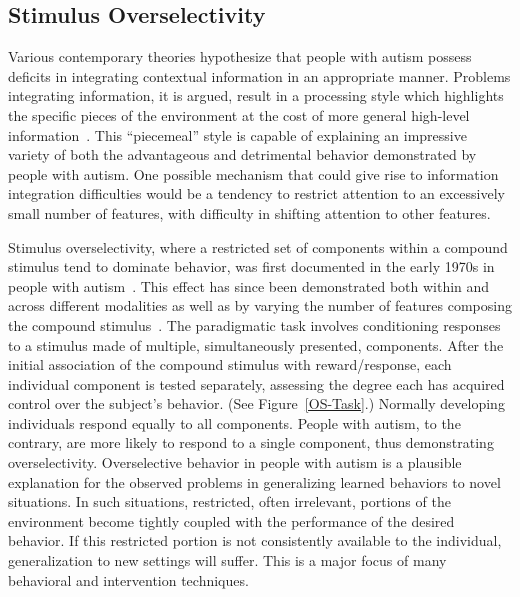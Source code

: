 %
%


\subsection{Stimulus Overselectivity}
Various contemporary theories hypothesize that people with autism possess deficits in integrating contextual information in an appropriate manner.  Problems integrating information, it is argued, result in a processing style which highlights the specific pieces of the environment at the cost of more general high-level information~\cite{HappeF:1999:WCC}. This ``piecemeal'' style is capable of explaining an impressive variety of both the advantageous and detrimental behavior demonstrated by people with autism.  One possible mechanism that could give rise to information integration difficulties would be a tendency to restrict attention to an excessively small number of features, with difficulty in shifting attention to other features.  

Stimulus overselectivity, where a restricted set of components within a compound stimulus tend to dominate behavior, was first documented in the early 1970s in people with autism~\cite{LovaasO:1971:Selective}.  This effect has since been demonstrated both within and across different modalities as well as by varying the number of features composing the compound stimulus~\cite{ReedP:2005:TaskLoad}.  The paradigmatic task involves conditioning responses to a stimulus made of multiple, simultaneously presented, components.  After the initial association of the compound stimulus with reward/response, each individual component is tested separately, assessing the degree each has acquired control over the subject's behavior. (See Figure~\ref{OS-Task}.)  Normally developing individuals respond equally to all components.  People with autism, to the contrary, are more likely to respond to a single component, thus demonstrating overselectivity.  Overselective behavior in people with autism is a plausible explanation for the observed problems in generalizing learned behaviors to novel situations.  In such situations, restricted, often irrelevant, portions of the environment become tightly coupled with the performance of the desired behavior.  If this restricted portion is not consistently available to the individual, generalization to new settings will suffer.  This is a major focus of many behavioral and intervention techniques. 

